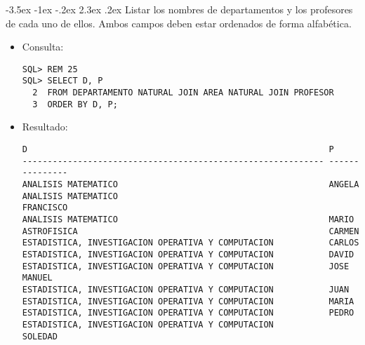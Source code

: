 \documentclass[11pt]{report}
\makeatletter
\renewcommand\chapter{\@startsection{chapter}{0}{\z@}%
    {-3.5ex \@plus -1ex \@minus -.2ex}%
    {2.3ex \@plus.2ex}%
    {\normalfont\Large\bfseries}}
\makeatother
\begin{document}
\newpage

\chapter{Listar los nombres de departamentos y los profesores de cada uno de ellos. Ambos campos deben estar ordenados de forma alfabética.}
\begin{itemize}
  \item Consulta:
  \begin{verbatim}
SQL> REM 25
SQL> SELECT D, P
  2  FROM DEPARTAMENTO NATURAL JOIN AREA NATURAL JOIN PROFESOR
  3  ORDER BY D, P;
  \end{verbatim}
  \item{Resultado:}
  \begin{verbatim}
D                                                            P                                                                                                                      
------------------------------------------------------------ ---------------                                                           
ANALISIS MATEMATICO                                          ANGELA                                                                                                                 
ANALISIS MATEMATICO                                          FRANCISCO                                                                                                              
ANALISIS MATEMATICO                                          MARIO                                                                                                                  
ASTROFISICA                                                  CARMEN                                                                                                                 
ESTADISTICA, INVESTIGACION OPERATIVA Y COMPUTACION           CARLOS                                                                                                                 
ESTADISTICA, INVESTIGACION OPERATIVA Y COMPUTACION           DAVID                                                                                                                  
ESTADISTICA, INVESTIGACION OPERATIVA Y COMPUTACION           JOSE MANUEL                                                                                                            
ESTADISTICA, INVESTIGACION OPERATIVA Y COMPUTACION           JUAN                                                                                                                   
ESTADISTICA, INVESTIGACION OPERATIVA Y COMPUTACION           MARIA                                                                                                                  
ESTADISTICA, INVESTIGACION OPERATIVA Y COMPUTACION           PEDRO                                                                                                                  
ESTADISTICA, INVESTIGACION OPERATIVA Y COMPUTACION           SOLEDAD                                                                                                                


\end{verbatim}
\end{itemize}
\end{document}

